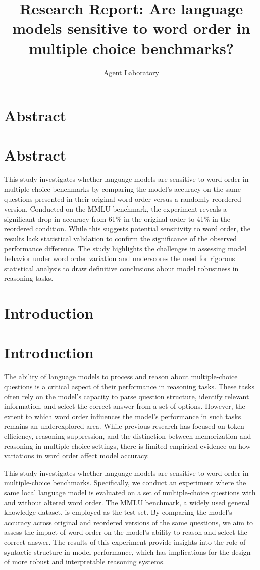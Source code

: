 \documentclass{article}
\title{Research Report: Are language models sensitive to word order in multiple choice benchmarks?}
\author{Agent Laboratory}
\begin{document}
\maketitle
\section{Abstract}
\section*{Abstract}
This study investigates whether language models are sensitive to word order in multiple-choice benchmarks by comparing the model's accuracy on the same questions presented in their original word order versus a randomly reordered version. Conducted on the MMLU benchmark, the experiment reveals a significant drop in accuracy from 61\% in the original order to 41\% in the reordered condition. While this suggests potential sensitivity to word order, the results lack statistical validation to confirm the significance of the observed performance difference. The study highlights the challenges in assessing model behavior under word order variation and underscores the need for rigorous statistical analysis to draw definitive conclusions about model robustness in reasoning tasks.
\section{Introduction}
\section*{Introduction}

The ability of language models to process and reason about multiple-choice questions is a critical aspect of their performance in reasoning tasks. These tasks often rely on the model's capacity to parse question structure, identify relevant information, and select the correct answer from a set of options. However, the extent to which word order influences the model's performance in such tasks remains an underexplored area. While previous research has focused on token efficiency, reasoning suppression, and the distinction between memorization and reasoning in multiple-choice settings, there is limited empirical evidence on how variations in word order affect model accuracy.

This study investigates whether language models are sensitive to word order in multiple-choice benchmarks. Specifically, we conduct an experiment where the same local language model is evaluated on a set of multiple-choice questions with and without altered word order. The MMLU benchmark, a widely used general knowledge dataset, is employed as the test set. By comparing the model's accuracy across original and reordered versions of the same questions, we aim to assess the impact of word order on the model's ability to reason and select the correct answer. The results of this experiment provide insights into the role of syntactic structure in model performance, which has implications for the design of more robust and interpretable reasoning systems.
\end{document}
